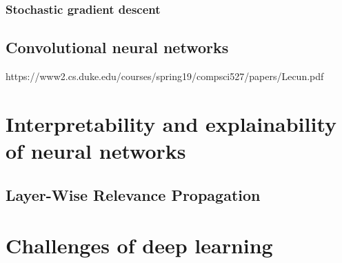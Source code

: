 \subsubsection*{Stochastic gradient descent}
\subsection{Convolutional neural networks}

https://www2.cs.duke.edu/courses/spring19/compsci527/papers/Lecun.pdf
\section{Interpretability and explainability of neural networks}
\subsection{Layer-Wise Relevance Propagation}
\section{Challenges of deep learning}